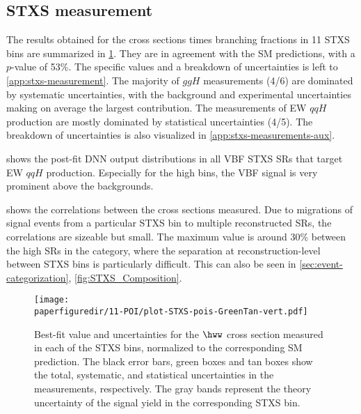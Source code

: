 \subsection{STXS measurement}
The results obtained for the cross sections times branching fractions in 11 STXS bins are summarized in \cref{fig:11-POI_measurement}. 
They are in agreement with the SM predictions, with a $p$-value of 53\%.
The specific values and a breakdown of uncertainties is left to \cref{app:stxs-measurement}. 
The majority of $ggH$ measurements (4/6) are dominated by systematic uncertainties, with the background and experimental uncertainties making on average the largest contribution. 
The measurements of EW $qqH$ production are mostly dominated by statistical uncertainties (4/5). 
The breakdown of uncertainties is also visualized in \cref{app:stxs-measurements-aux}. 

 shows the post-fit DNN output distributions in all VBF STXS SRs that target EW $qqH$ production. 
Especially for the high \mjj bins, the VBF signal is very prominent above the backgrounds. 

 shows the correlations between the cross sections measured. 
Due to migrations of signal events from a particular STXS bin to multiple reconstructed SRs, the correlations are sizeable but small. The maximum value is around 30\% between the high \pTH SRs in the \TwoJet category, where the separation at reconstruction-level between STXS bins is particularly difficult. This can also be seen in \cref{sec:event-categorization}, \cref{fig:STXS_Composition}. 

\begin{figure}[htb]
  \centering
  \texttt{[image: \\paperfiguredir/11-POI/plot-STXS-pois-GreenTan-vert.pdf]}
  \caption{
    Best-fit value and uncertainties for the $\hww$ cross section measured in each of the STXS bins, normalized to the corresponding SM prediction.
    The black error bars, green boxes and tan boxes show the total, systematic, and statistical uncertainties in the measurements, respectively.
    The gray bands represent the theory uncertainty of the signal yield in the corresponding STXS bin.
    \label{fig:11-POI_measurement}
  }
\end{figure}

